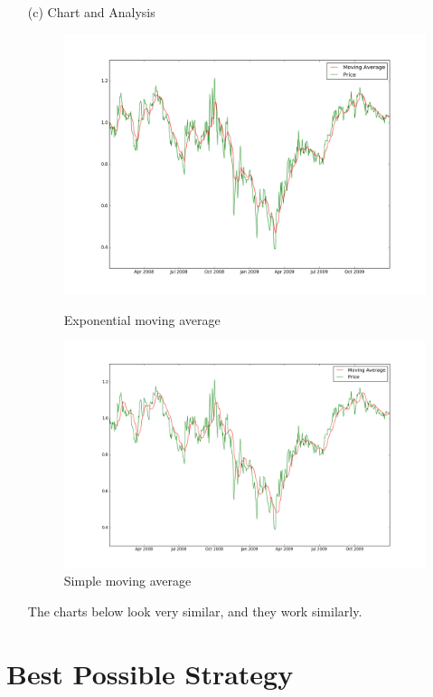 \documentclass[a4paper]{article}
\begin{document}
\begin{itemize}
		\item[(c)] Chart and Analysis\\
			\begin{figure}[!htb]
			\includegraphics[width=\linewidth]{ema.png}
			\caption{Exponential moving average}\label{fig:awesome_image1}
			\endminipage\hfill
			\includegraphics[width=\linewidth]{sma.png}
			\caption{Simple moving average}\label{fig:awesome_image2}
			\endminipage

			\end{figure}
			The charts below look very similar, and they work similarly.
	\end{itemize}


\section{Best Possible Strategy}
\end{document}
